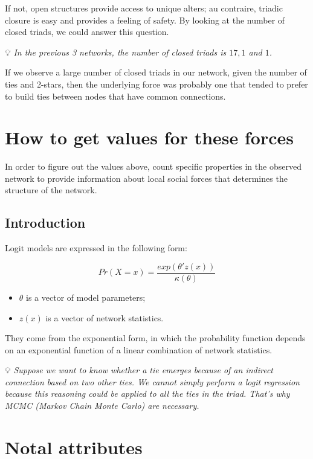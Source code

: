 \documentclass[
  notitlepage,
  onecolumn,
  openany]{book}
\providecommand{\tightlist}{%
  \setlength{\itemsep}{0pt}\setlength{\parskip}{0pt}}
\begin{document}
If not, open structures provide access to unique alters; au contraire, triadic closure is easy and provides a feeling of safety. By looking at the number of closed triads, we could answer this question.

💡 \emph{In the previous 3 networks, the number of closed triads is \(17, 1\) and \(1\).}

If we observe a large number of closed triads in our network, given the number of ties and 2-stars, then the underlying force was probably one that tended to prefer to build ties between nodes that have common connections.

\hypertarget{how-to-get-values-for-these-forces}{%
\section{How to get values for these forces}\label{how-to-get-values-for-these-forces}}

In order to figure out the values above, count specific properties in the observed network to provide information about local social forces that determines the structure of the network.

\hypertarget{introduction-2}{%
\subsection{Introduction}\label{introduction-2}}

Logit models are expressed in the following form:

\[
Pr(X=x) = \frac{exp(\theta'z(x))}{\kappa(\theta)}
\]

\begin{itemize}
\tightlist
\item
  \(\theta\) is a vector of model parameters;
\item
  \(z(x)\) is a vector of network statistics.
\end{itemize}

They come from the exponential form, in which the probability function depends on an exponential function of a linear combination of network statistics.

💡 \emph{Suppose we want to know whether a tie emerges because of an indirect connection based on two other ties. We cannot simply perform a logit regression because this reasoning could be applied to all the ties in the triad. That's why MCMC (Markov Chain Monte Carlo) are necessary.}

\hypertarget{notal-attributes}{%
\section{Notal attributes}\label{notal-attributes}}
\end{document}
